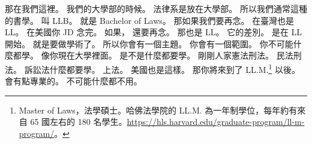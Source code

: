 \hypertarget{c01:cue:2782}{}那在我們這裡。
\hypertarget{c01:cue:2783}{}我們的大學部的時候。
\hypertarget{c01:cue:2784}{}法律系是放在大學部。
\hypertarget{c01:cue:2785}{}所以我們通常這種的書學。
\hypertarget{c01:cue:2786}{}叫 LLB。
\hypertarget{c01:cue:2787}{}就是 Bachelor of Laws。
\hypertarget{c01:cue:2788}{}那如果我們要再念。
\hypertarget{c01:cue:2789}{}在臺灣也是 LL。
\hypertarget{c01:cue:2790}{}在美國你 JD 念完。
\hypertarget{c01:cue:2791}{}如果，
\hypertarget{c01:cue:2792}{}還要再念。
\hypertarget{c01:cue:2793}{}那也是 LL。
\hypertarget{c01:cue:2794}{}它的差別。
\hypertarget{c01:cue:2795}{}是在 LL 開始。
\hypertarget{c01:cue:2796}{}就是要做學術了。
\hypertarget{c01:cue:2797}{}所以你會有一個主題。
\hypertarget{c01:cue:2798}{}你會有一個範圍。
\hypertarget{c01:cue:2799}{}你不可能什麼都學。
\hypertarget{c01:cue:2800}{}像你現在大學裡面。
\hypertarget{c01:cue:2801}{}是不是什麼都要學。
\hypertarget{c01:cue:2802}{}剛剛人家憲法刑法。
\hypertarget{c01:cue:2803}{}民法刑法。
\hypertarget{c01:cue:2804}{}訴訟法什麼都要學。
\hypertarget{c01:cue:2805}{}上法。
\hypertarget{c01:cue:2806}{}美國也是這樣。
\hypertarget{c01:cue:2807}{}那你將來到了 LL.M.\footnote{Master of Laws，法學碩士。哈佛法學院的 LL.M. 為一年制學位，每年約有來自 65 國左右的 180 名學生。\url{https://hls.harvard.edu/graduate-program/ll-m-program/}。} 以後。
\hypertarget{c01:cue:2808}{}會有點專業的。
\hypertarget{c01:cue:2809}{}不可能什麼都不用。

